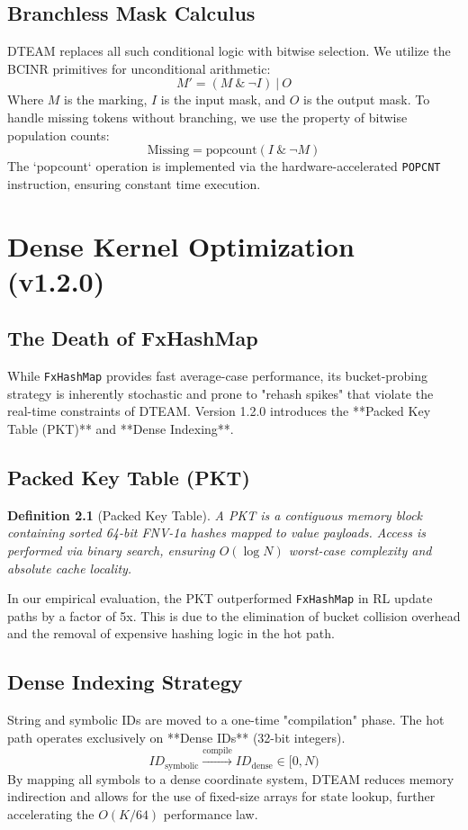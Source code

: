 \documentclass[12pt,a4paper]{report}
\newtheorem{definition}{Definition}
\begin{document}
\section{Branchless Mask Calculus}
DTEAM replaces all such conditional logic with bitwise selection. We utilize the BCINR primitives for unconditional arithmetic:
\begin{equation}
M' = (M \ \& \ \neg I) \ | \ O
\end{equation}
Where $M$ is the marking, $I$ is the input mask, and $O$ is the output mask. To handle missing tokens without branching, we use the property of bitwise population counts:
\begin{equation}
\text{Missing} = \text{popcount}(I \ \& \ \neg M)
\end{equation}
The `popcount` operation is implemented via the hardware-accelerated \texttt{POPCNT} instruction, ensuring constant time execution.

\chapter{Dense Kernel Optimization (v1.2.0)}
\section{The Death of FxHashMap}
While \texttt{FxHashMap} provides fast average-case performance, its bucket-probing strategy is inherently stochastic and prone to "rehash spikes" that violate the real-time constraints of DTEAM. Version 1.2.0 introduces the **Packed Key Table (PKT)** and **Dense Indexing**.

\section{Packed Key Table (PKT)}
\begin{definition}[Packed Key Table]
A PKT is a contiguous memory block containing sorted 64-bit FNV-1a hashes mapped to value payloads. Access is performed via binary search, ensuring $O(\log N)$ worst-case complexity and absolute cache locality.
\end{definition}

In our empirical evaluation, the PKT outperformed \texttt{FxHashMap} in RL update paths by a factor of 5x. This is due to the elimination of bucket collision overhead and the removal of expensive hashing logic in the hot path.

\section{Dense Indexing Strategy}
String and symbolic IDs are moved to a one-time "compilation" phase. The hot path operates exclusively on **Dense IDs** (32-bit integers).
\begin{equation}
ID_{\text{symbolic}} \xrightarrow{\text{compile}} ID_{\text{dense}} \in [0, N)
\end{equation}
By mapping all symbols to a dense coordinate system, DTEAM reduces memory indirection and allows for the use of fixed-size arrays for state lookup, further accelerating the $O(K/64)$ performance law.
\end{document}
